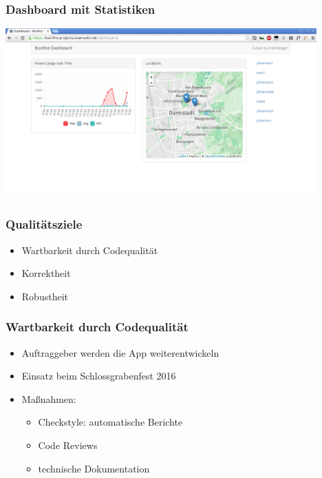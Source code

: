 \documentclass[accentcolor=tud2d,colorbacktitle]{tudbeamer}
\begin{document}
  \begin{frame}
    \frametitle{Dashboard mit Statistiken}
    \begin{center}
      \includegraphics[height=6.5cm]{dashboard.png}
    \end{center}
  \end{frame}

  \begin{frame}
    \frametitle{Qualitätsziele}
    \begin{itemize}
      \item Wartbarkeit durch Codequalität
      \item Korrektheit
      \item Robustheit
    \end{itemize}
  \end{frame}

  \begin{frame}
    \frametitle{Wartbarkeit durch Codequalität}
    \begin{itemize}
      \item Auftraggeber werden die App weiterentwickeln
      \item Einsatz beim Schlossgrabenfest 2016
    \end{itemize}
    \begin{itemize}
      \item Maßnahmen:
        \begin{itemize}
          \item Checkstyle: automatische Berichte
          \item Code Reviews
          \item technische Dokumentation
        \end{itemize}
    \end{itemize}
  \end{frame}
\end{document}
